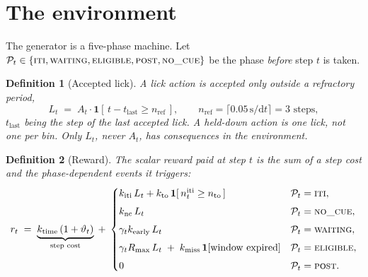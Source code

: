 \documentclass[11pt]{article}
\newtheorem{definition}{Definition}
\newcommand{\1}{\mathbf{1}}
\begin{document}
\section{The environment}\label{sec:env}

The generator is a five-phase machine. Let $\mathcal{P}_t \in \{\textsc{iti}, \textsc{waiting},
\textsc{eligible}, \textsc{post}, \textsc{no\_cue}\}$ be the phase \emph{before} step $t$ is
taken.

\begin{definition}[Accepted lick]
A lick action is accepted only outside a refractory period,
\begin{equation}
  L_t \;=\; A_t \cdot \1\!\left[\, t - t_{\mathrm{last}} \ge n_{\mathrm{ref}} \,\right],
  \qquad n_{\mathrm{ref}} = \lceil 0.05\,\mathrm{s}/\mathrm{d}t\rceil = 3 \text{ steps},
\end{equation}
$t_{\mathrm{last}}$ being the step of the last accepted lick. A held-down action is one lick,
not one per bin. Only $L_t$, never $A_t$, has consequences in the environment.
\end{definition}

\begin{definition}[Reward]
The scalar reward paid at step $t$ is the sum of a step cost and the phase-dependent events it
triggers:
\begin{equation}
  r_t \;=\; \underbrace{k_{\mathrm{time}}\,(1 + \vartheta_t)}_{\text{step cost}}
  \;+\;
  \begin{cases}
    k_{\mathrm{iti}}\, L_t + k_{\mathrm{to}}\,\1[\,n^{\mathrm{iti}}_t \ge n_{\mathrm{to}}\,]
      & \mathcal{P}_t = \textsc{iti},\\[4pt]
    k_{\mathrm{nc}}\, L_t
      & \mathcal{P}_t = \textsc{no\_cue},\\[4pt]
    \gamma_t k_{\mathrm{early}}\, L_t
      & \mathcal{P}_t = \textsc{waiting},\\[4pt]
    \gamma_t R_{\max}\, L_t \;+\; k_{\mathrm{miss}}\,\1[\text{window expired}]
      & \mathcal{P}_t = \textsc{eligible},\\[4pt]
    0 & \mathcal{P}_t = \textsc{post}.
  \end{cases}
  \label{eq:reward}
\end{equation}
\end{definition}
\end{document}
